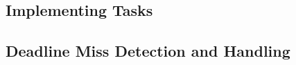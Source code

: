 \subsection{Implementing Tasks} %
\label{sub:implementing_tasks}



\subsection{Deadline Miss Detection and Handling} %
\label{sub:deadline_miss_detection_and_handling}

